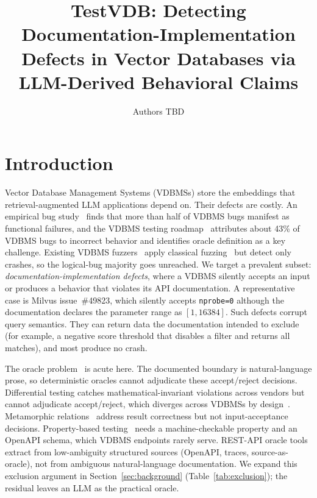 \documentclass[sigconf]{acmart}
\title[TestVDB: doc-implementation defects in VDBMSs]{TestVDB: Detecting Documentation-Implementation Defects in Vector Databases via LLM-Derived Behavioral Claims}
\author{Authors TBD}
\affiliation{\institution{TBD (anonymity depends on venue)}\country{TBD}}
\begin{document}
\maketitle

\section{Introduction}
\label{sec:intro}

Vector Database Management Systems (VDBMSs) store the embeddings that retrieval-augmented LLM applications depend on. Their defects are costly. An empirical bug study~\cite{bugstudy25} finds that more than half of VDBMS bugs manifest as functional failures, and the VDBMS testing roadmap~\cite{roadmap25} attributes about 43\% of VDBMS bugs to incorrect behavior and identifies oracle definition as a key challenge. Existing VDBMS fuzzers~\cite{vdbfuzz26} apply classical fuzzing~\cite{manes21} but detect only crashes, so the logical-bug majority goes unreached. We target a prevalent subset: \emph{documentation-implementation defects}, where a VDBMS silently accepts an input or produces a behavior that violates its API documentation. A representative case is Milvus issue~\#49823, which silently accepts \texttt{nprobe=0} although the documentation declares the parameter range as $[1, 16384]$. Such defects corrupt query semantics. They can return data the documentation intended to exclude (for example, a negative score threshold that disables a filter and returns all matches), and most produce no crash.

The oracle problem~\cite{barr15} is acute here. The documented boundary is natural-language prose, so deterministic oracles cannot adjudicate these accept/reject decisions. Differential testing catches mathematical-invariant violations across vendors but cannot adjudicate accept/reject, which diverges across VDBMSs by design~\cite{roadmap25}. Metamorphic relations~\cite{metmap24} address result correctness but not input-acceptance decisions. Property-based testing~\cite{claessen00} needs a machine-checkable property and an OpenAPI schema, which VDBMS endpoints rarely serve. REST-API oracle tools~\cite{agoraplus25,satori25,mastor26} extract from low-ambiguity structured sources (OpenAPI, traces, source-as-oracle), not from ambiguous natural-language documentation. We expand this exclusion argument in Section~\ref{sec:background} (Table~\ref{tab:exclusion}); the residual leaves an LLM as the practical oracle.
\end{document}
